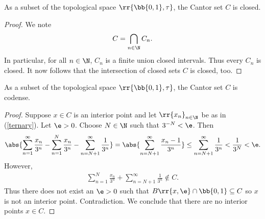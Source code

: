 \documentclass{article}
\begin{document}
\begin{claim*}[2b]
  As a subset of the topological space $\rr{\bb{0,1},\tau}$, the Cantor set $C$ is closed.
  \begin{proof}
    We note
    \begin{align*}
      C = \bigcap_{n\in\N} C_n.
    \end{align*}
    In particular, for all $n\in\N$, $C_n$ is a finite union closed intervals. Thus every
    $C_n$ is closed. It now follows that the intersection of closed sets $C$ is closed, too.
  \end{proof}
\end{claim*}

\begin{claim*}[2c]
  As a subset of the topological space $\rr{\bb{0,1},\tau}$, the Cantor set $C$ is codense.
  \begin{proof}
    Suppose $x\in C$ is an interior point and let $\rr{x_n}_{n\in\N}$ be as in (\ref{ternary}).
    Let $\e>0$. Choose $N\in\N$ such that
    $3^{-N}<\e$. Then
    \begin{align} \label{middle}
      \abs{\sum_{n=1}^{\infty} \frac{x_n}{3^n} - \sum_{n=1}^{N} \frac{x_n}{3^n} - \sum_{n=N+1}^{\infty} \frac{1}{3^n}}
      = \abs{\sum_{n =N+1}^{\infty} \frac{x_n - 1}{3^n}}
      \leq \sum_{n=N+1}^{\infty}\frac{1}{3^n}
      <\frac{1}{3^N}
      <\e.
    \end{align}
    However,
    \begin{align*}
      \sum_{n=1}^N \frac{x_n}{3^n} + \sum_{n=N+1}^{\infty} \frac{1}{3^n} \not\in C.
    \end{align*}
    Thus there does not exist an $\e>0$ such that $B\rr{x,\e}\cap\bb{0,1}\subseteq C$
    so $x$ is not an interior point. Contradiction. We conclude that there are no interior
    points $x\in C$.
  \end{proof}
\end{claim*}
\end{document}
